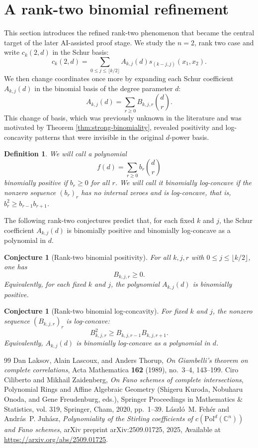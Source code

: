 \documentclass[10pt,a4paper]{amsart}
\numberwithin{equation}{section}
\newtheorem{conjecture}[theorem]{Conjecture}
\newtheorem{definition}[theorem]{Definition}
\begin{document}
\section{A rank-two binomial refinement}

This section introduces the refined rank-two phenomenon that became the central target of the later AI-assisted proof stage.
We study the $n=2$, rank two case and write $c_k(2,d)$ in the Schur basis:
\[
  c_k(2,d)=\sum_{0\le j\le\lfloor k/2\rfloor}A_{k,j}(d)s_{(k-j,j)}(x_1,x_2).
\]
We then change coordinates once more by expanding each Schur coefficient $A_{k,j}(d)$ in the binomial basis of the degree parameter $d$:
\[
  A_{k,j}(d)=\sum_{r\ge0} B_{k,j,r}\binom{d}{r}.
\]
This change of basis, which was previously unknown in the literature and was motivated by Theorem \ref{thm:strong-binomiality}, revealed positivity and log-concavity patterns that were invisible in the original $d$-power basis.  

\begin{definition}\label{def:binom} We will call a polynomial
\[
  f(d)=\sum_{r\ge0} b_r\binom{d}{r}
\]
\emph{binomially positive} if $b_r\ge0$ for all $r$.  We will call it \emph{binomially log-concave} if the nonzero sequence $(b_r)_r$ has no internal zeroes and is log-concave, that is, $b_r^2\ge b_{r-1}b_{r+1}$.
\end{definition}
The following rank-two conjectures predict that, for each fixed $k$ and $j$, the Schur coefficient $A_{k,j}(d)$ is binomially positive and binomially log-concave as a polynomial in $d$.  


\begin{conjecture}[Rank-two binomial positivity]\label{conj:A}
For all $k,j,r$ with $0\le j\le\lfloor k/2\rfloor$, one has
\[
  B_{k,j,r}\ge0.
\]
Equivalently, for each fixed $k$ and $j$, the polynomial $A_{k,j}(d)$ is binomially positive.
\end{conjecture}

\begin{conjecture}[Rank-two binomial log-concavity]\label{conj:B}
For fixed $k$ and $j$, the nonzero sequence $(B_{k,j,r})_r$ is log-concave:
\[
  B_{k,j,r}^2\ge B_{k,j,r-1}B_{k,j,r+1}.
\]
Equivalently, $A_{k,j}(d)$ is binomially log-concave as a polynomial in $d$.
\end{conjecture}

\begin{thebibliography}{99}
 Dan Laksov, Alain Lascoux, and Anders Thorup, \emph{On {Giambelli}'s theorem on complete correlations}, Acta Mathematica \textbf{162} (1989), no.~3--4, 143--199.
 Ciro Ciliberto and Mikhail Zaidenberg, \emph{On {Fano} schemes of complete intersections}, Polynomial Rings and Affine Algebraic Geometry (Shigeru Kuroda, Nobuharu Onoda, and Gene Freudenburg, eds.), Springer Proceedings in Mathematics \& Statistics, vol. 319, Springer, Cham, 2020, pp.~1--39.
 L{\'a}szl{\'o}~M. Feh{\'e}r and Andr{\'a}s~P. Juh{\'a}sz, \emph{Polynomiality of the {Stirling} coefficients of {$c(\mathrm{Pol}^d(\mathbb{C}^n))$} and {Fano} schemes}, arXiv preprint arXiv:2509.01725, 2025, Available at \url{https://arxiv.org/abs/2509.01725}.
\end{thebibliography}
\end{document}
